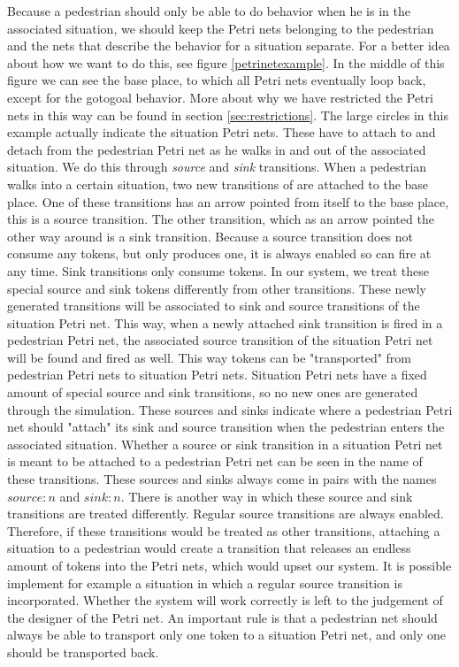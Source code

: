 \documentclass[11pt, a4paper]{book}
\begin{document}
Because a pedestrian should only be able to do behavior when he is in the associated situation, we should keep the Petri nets belonging to the pedestrian and the nets that describe the behavior for a situation separate. For a better idea about how we want to do this, see figure \ref{petrinetexample}. In the middle of this figure we can see the base place, to which all Petri nets eventually loop back, except for the gotogoal behavior. More about why we have restricted the Petri nets in this way can be found in section \ref{sec:restrictions}. The large circles in this example actually indicate the situation Petri nets. These have to attach to and detach from the pedestrian Petri net as he walks in and out of the associated situation. We do this through \emph{source} and \emph{sink} transitions. When a pedestrian walks into a certain situation, two new transitions of are attached to the base place. One of these transitions has an arrow pointed from itself to the base place, this is a source transition. The other transition, which as an arrow pointed the other way around is a sink transition. Because a source transition does not consume any tokens, but only produces one, it is always enabled so can fire at any time. Sink transitions only consume tokens. In our system, we treat these special source and sink tokens differently from other transitions. These newly generated transitions will be associated to sink and source transitions of the situation Petri net. This way, when a newly attached sink transition is fired in a pedestrian Petri net, the associated source transition of the situation Petri net will be found and fired as well. This way tokens can be "transported" from pedestrian Petri nets to situation Petri nets. Situation Petri nets have a fixed amount of special source and sink transitions, so no new ones are generated through the simulation. These sources and sinks indicate where a pedestrian Petri net should "attach" its sink and source transition when the pedestrian enters the associated situation. Whether a source or sink transition in a situation Petri net is meant to be attached to a pedestrian Petri net can be seen in the name of these transitions. These sources and sinks always come in pairs with the names $source:n$ and $sink:n$.
There is another way in which these source and sink transitions are treated differently. Regular source transitions are always enabled. Therefore, if these transitions would be treated as other transitions, attaching a situation to a pedestrian would create a transition that releases an endless amount of tokens into the Petri nets, which would upset our system. It is possible implement for example a situation in which a regular source transition is incorporated. Whether the system will work correctly is left to the judgement of the designer of the Petri net. An important rule is that a pedestrian net should always be able to transport only one token to a situation Petri net, and only one should be transported back.
\end{document}
